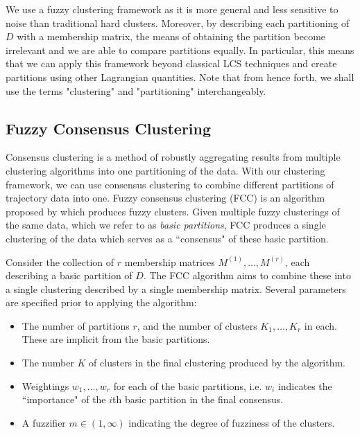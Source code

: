 \documentclass[a4paper, fontsize=12pt]{article}
\begin{document}
We use a fuzzy clustering framework as it is more general and less sensitive to noise than traditional hard clusters. Moreover, by describing each partitioning of \(D\) with a membership matrix, the means of obtaining the partition become irrelevant and we are able to compare partitions equally. In particular, this means that we can apply this framework beyond classical LCS techniques and create partitions using other Lagrangian quantities. Note that from hence forth, we shall use the terms "clustering" and "partitioning" interchangeably. 






\subsection{Fuzzy Consensus Clustering}
Consensus clustering is a method of robustly aggregating results from multiple clustering algorithms into one partitioning of the data. With our clustering framework, we can use consensus clustering to combine different partitions of trajectory data into one. Fuzzy consensus clustering (FCC) is an algorithm proposed by \cite{wu_2017_fcc} which produces fuzzy clusters. Given multiple fuzzy clusterings of the same data, which we refer to as \textit{basic partitions}, FCC produces a single clustering of the data which serves as a ``consensus" of these basic partition.


Consider the collection of \(r\) membership matrices \(M^{(1)},\hdots, M^{(r)}\), each describing a basic partition of \(D\). The FCC algorithm aims to combine these into a single clustering described by a single membership matrix. Several parameters are specified prior to applying the algorithm:
\begin{itemize}
\item The number of partitions \(r\), and the number of clusters \(K_1, \hdots, K_r\) in each. These are implicit from the basic partitions.
\item The number \(K\) of clusters in the final clustering produced by the algorithm.
\item Weightings \(w_1,\hdots, w_r\) for each of the basic partitions, i.e. \(w_i\) indicates the ``importance" of the \(i\)th basic partition in the final consensus.
\item A fuzzifier \(m \in (1,\infty)\) indicating the degree of fuzziness of the clusters.
\end{itemize}
\end{document}
